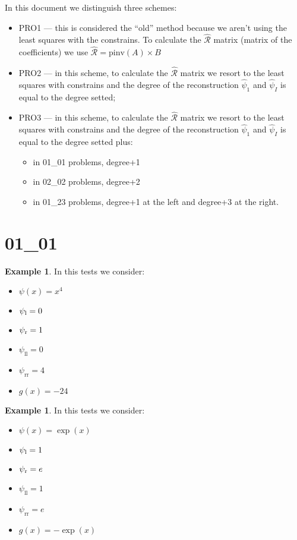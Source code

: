 \documentclass[11pt,a4paper]{article}
\author{}
\title{}
\theoremstyle{plain}
\theoremstyle{definition}
\newtheorem{exmp}[thm]{Example} %
\begin{document}
\tableofcontents
\listoftables

\dotfill

In this document we distinguish three schemes:
\begin{itemize}
\item PRO1 --- this is considered the ``old'' method because we aren't using the least squares with the constrains. To calculate the $\widehat{\mathcal{R}}$ matrix (matrix of the coefficients) we use $\widehat{\mathcal{R}}=\text{pinv}(A)\times B$
\item PRO2 --- in this scheme, to calculate the $\widehat{\mathcal{R}}$ matrix we resort to the least squares with constrains and the degree of the reconstruction $\widehat{\psi}_1$ and $\widehat{\psi}_I$ is equal to the degree setted;
\item PRO3 --- in this scheme, to calculate the $\widehat{\mathcal{R}}$ matrix we resort to the least squares with constrains and the degree of the reconstruction $\widehat{\psi}_1$ and $\widehat{\psi}_I$ is equal to the degree setted plus:
	\begin{itemize}
	\item in 01\_01 problems, degree+1
	\item in 02\_02 problems, degree+2
	\item in 01\_23 problems, degree+1 at the left and degree+3 at the right.
	\end{itemize}
\end{itemize}

\pagebreak
\section{01\_01}
\begin{exmp}
\label{Example:PRO:bending:01_01_glob3v2}
In this tests we consider:
\begin{itemize}
\item $\psi(x)=x^4$
\item $\psi_\text l=0$
\item $\psi_\text r=1$
\item $\psi_\text{ll}=0$
\item $\psi_\text{rr}=4$
\item $g(x)=-24$
\end{itemize}
\end{exmp}



\pagebreak

\begin{exmp}
\label{Example:PRO:bending:01_01_glob1v2}
In this tests we consider:
\begin{itemize}
\item $\psi(x)=\exp(x)$
\item $\psi_\text l=1$
\item $\psi_\text r=e$
\item $\psi_\text{ll}=1$
\item $\psi_\text{rr}=e$
\item $g(x)=-\exp(x)$
\end{itemize}
\end{exmp}



\pagebreak 
\end{document}

